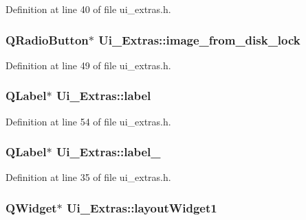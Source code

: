 Definition at line 40 of file ui\_\-extras.h.

\hypertarget{classUi__Extras_a4727a96c8081f654bc01d2094a19fd45}{
\subsubsection[{image\_\-from\_\-disk\_\-lock}]{\setlength{\rightskip}{0pt plus 5cm}QRadioButton$\ast$ {\bf Ui\_\-Extras::image\_\-from\_\-disk\_\-lock}}}
\label{classUi__Extras_a4727a96c8081f654bc01d2094a19fd45}


Definition at line 49 of file ui\_\-extras.h.

\hypertarget{classUi__Extras_a3c1aafcef167011e29b40fdf9b828d51}{
\subsubsection[{label}]{\setlength{\rightskip}{0pt plus 5cm}QLabel$\ast$ {\bf Ui\_\-Extras::label}}}
\label{classUi__Extras_a3c1aafcef167011e29b40fdf9b828d51}


Definition at line 54 of file ui\_\-extras.h.

\hypertarget{classUi__Extras_a0a5ec50ecaca1072b40e7857397ef890}{
\subsubsection[{label\_\-12}]{\setlength{\rightskip}{0pt plus 5cm}QLabel$\ast$ {\bf Ui\_\-Extras::label\_}}}
\label{classUi__Extras_a0a5ec50ecaca1072b40e7857397ef890}


Definition at line 35 of file ui\_\-extras.h.

\hypertarget{classUi__Extras_afa6756d7678bcf68325320b8d0260551}{
\subsubsection[{layoutWidget1}]{\setlength{\rightskip}{0pt plus 5cm}QWidget$\ast$ {\bf Ui\_\-Extras::layoutWidget1}}}
\label{classUi__Extras_afa6756d7678bcf68325320b8d0260551}


